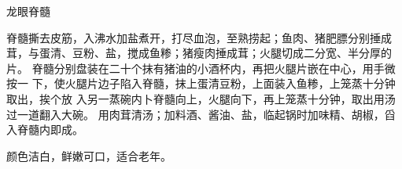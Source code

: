 \begin{recipe}{龙眼脊髓}

\ingredients


\cooking

\step 脊髓撕去皮筋，入沸水加盐煮开，打尽血泡，至熟捞起；鱼肉、猪肥膘分别捶成
茸，与蛋清、豆粉、盐，搅成鱼糁；猪瘦肉捶成茸；火腿切成二分宽、半分厚的片。
\step 脊髓分别盘装在二十个抹有猪油的小酒杯内，再把火腿片嵌在中心，用手微按一
下，使火腿片边子陷入脊髓，抹上蛋清豆粉，上面装入鱼糁，上笼蒸十分钟取出，挨个放
入另一蒸碗内卜脊髓向上，火腿向下，再上笼蒸十分钟，取出用汤过一道翻入大碗。
\step 用肉茸清汤；加料酒、酱油、盐，临起锅时加味精、胡椒，舀入脊髓内即成。

\notes

颜色洁白，鲜嫩可口，适合老年。

\end{recipe}

